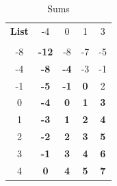 \documentclass[a4paper,11pt]{article}
\begin{document}
    \begin{table}[ht]
        \centering
        \caption {Sums}
        \begin{tabular}{c c c c c  }
            \toprule
            \textbf{ List}  & \tiny{-4}         & \tiny{0}              & \tiny{1}                  & \tiny{3} \\                   \\
            \midrule    
            \tiny{-8}       &   \textbf{-12}    & {\footnotesize -8}    &  {\footnotesize -7}       & {\footnotesize-5 }            \\ 
            \tiny{-4}       &   \textbf{-8}     & \textbf{-4}           &  {\footnotesize -3}       &  {\footnotesize{-1}  }         \\ 
            \tiny{-1}       &   \textbf{-5}     & \textbf{-1}           &  \textbf{0}               &  {\footnotesize{2} }          \\ 
            \tiny{0}        &   \textbf{-4}     & \textbf{0}            &  \textbf{1}               &  \textbf{3}                   \\ 
            \tiny{1}        &   \textbf{-3}     & \textbf{1}            &  \textbf{2}               &  \textbf{4}                   \\ 
            \tiny{2}        &   \textbf{-2}     & \textbf{2}            &  \textbf{3}               &  \textbf{5}                   \\ 
            \tiny{3}        &   \textbf{-1}     & \textbf{3}            &  \textbf{4}               &  \textbf{6}                   \\ 
            \tiny{4}        &   \textbf{0 }     & \textbf{4}            &  \textbf{5}               &  \textbf{7}                   \\ 

            \bottomrule
        \end{tabular}
    \end{table}

        
\end{document}
